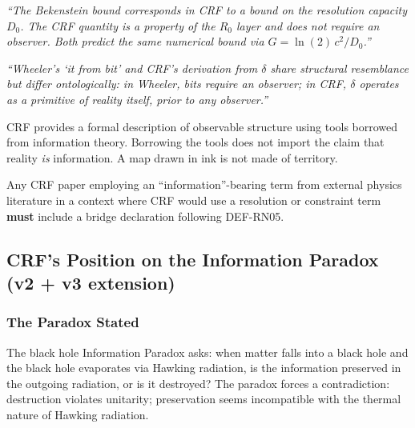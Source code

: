 \documentclass[12pt, a4paper]{article}
\begin{document}
\begin{keybox}[title={Bridge declaration --- Bekenstein bound}]
\textit{``The Bekenstein bound corresponds in CRF to a bound on
the resolution capacity $D_0$. The CRF quantity is a property of
the $R_0$ layer and does not require an observer. Both predict
the same numerical bound via $G = \ln(2)\,c^2/D_0$.''}
\end{keybox}

\begin{keybox}[title={Bridge declaration --- Wheeler}]
\textit{``Wheeler's `it from bit' and CRF's derivation from
$\delta$ share structural resemblance but differ ontologically:
in Wheeler, bits require an observer; in CRF, $\delta$ operates
as a primitive of reality itself, prior to any observer.''}
\end{keybox}

\begin{keybox}[title={CLM-RN02: The universe in CRF is not
computed; it is described}]
CRF provides a formal description of observable structure using
tools borrowed from information theory. Borrowing the tools does
not import the claim that reality \emph{is} information.
A map drawn in ink is not made of territory.
\end{keybox}

\begin{keybox}[title={CLM-RN03: The Interface Protocol is not
optional for external-facing CRF papers}]
Any CRF paper employing an ``information''-bearing term from
external physics literature in a context where CRF would use
a resolution or constraint term \textbf{must} include a bridge
declaration following DEF-RN05.
\end{keybox}

\subsection{CRF's Position on the Information Paradox
(v2 + v3 extension)}
\label{sec:info-paradox}

\subsubsection{The Paradox Stated}

The black hole Information Paradox asks: when matter falls into a
black hole and the black hole evaporates via Hawking radiation,
is the information preserved in the outgoing radiation, or is it
destroyed? The paradox forces a contradiction: destruction violates
unitarity; preservation seems incompatible with the thermal nature
of Hawking radiation.
\end{document}
